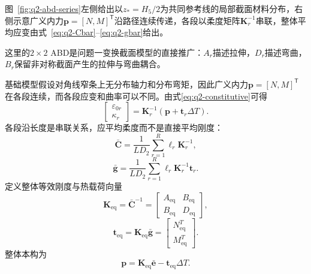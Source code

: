 \documentclass[draft,12pt,a4paper]{ctexart}
\theoremstyle{definition}
\begin{document}
图~\ref{fig:q2-abd-series}左侧给出以$z_*=H_5/2$为共同参考线的局部截面材料分布，右侧示意广义内力$\mathbf p=[N,M]^{\mathsf T}$沿路径连续传递，各段以柔度矩阵$\mathbf K_r^{-1}$串联，整体平均应变由式~\eqref{eq:q2-Cbar}--\eqref{eq:q2-gbar}给出。

这里的$2\times2$ ABD是问题一变换截面模型的直接推广：$A_r$描述拉伸，$D_r$描述弯曲，$B_r$保留非对称截面产生的拉伸与弯曲耦合。

基础模型假设对角线窄条上无分布轴力和分布弯矩，因此广义内力$\mathbf p=[N,M]^{\mathsf T}$在各段连续，而各段应变和曲率可以不同。由式\eqref{eq:q2-constitutive}可得
\begin{equation}\label{eq:q2-localdef}
\begin{bmatrix}\varepsilon_{0r}\\\kappa_r\end{bmatrix}
=\mathbf K_r^{-1}(\mathbf p+\mathbf t_r\Delta T).
\end{equation}
各段沿长度是串联关系，应平均柔度而不是直接平均刚度：
\begin{equation}\label{eq:q2-Cbar}
\bar{\mathbf C}
=\frac{1}{LD_2}\sum_{r=1}^{R}\ell_r\mathbf K_r^{-1},
\end{equation}
\begin{equation}\label{eq:q2-gbar}
\bar{\mathbf g}
=\frac{1}{LD_2}\sum_{r=1}^{R}
\ell_r\mathbf K_r^{-1}\mathbf t_r.
\end{equation}
定义整体等效刚度与热载荷向量
\begin{equation}\label{eq:q2-Keq}
\mathbf K_{\mathrm{eq}}=\bar{\mathbf C}^{-1}
=\begin{bmatrix}
A_{\mathrm{eq}}&B_{\mathrm{eq}}\\
B_{\mathrm{eq}}&D_{\mathrm{eq}}
\end{bmatrix},
\end{equation}
\begin{equation}\label{eq:q2-teq}
\mathbf t_{\mathrm{eq}}
=\mathbf K_{\mathrm{eq}}\bar{\mathbf g}
=\begin{bmatrix}N_{\mathrm{eq}}^T\\M_{\mathrm{eq}}^T\end{bmatrix}.
\end{equation}
整体本构为
\begin{equation}\label{eq:q2-global}
\mathbf p
=\mathbf K_{\mathrm{eq}}\bar{\mathbf e}
-\mathbf t_{\mathrm{eq}}\Delta T.
\end{equation}
\end{document}

